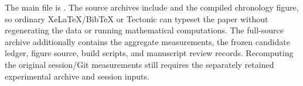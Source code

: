 The main file is . The source archives include
 and the compiled chronology figure, so ordinary
XeLaTeX/BibTeX or Tectonic can typeset the paper without regenerating
the data or running mathematical computations. The full-source archive
additionally contains the aggregate measurements, the frozen candidate
ledger, figure source, build scripts, and manuscript review records.
Recomputing the original session/Git measurements still requires the
separately retained experimental archive and session inputs.

